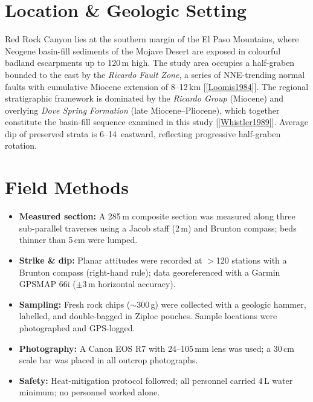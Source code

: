 \documentclass[11pt,a4paper]{article}
\begin{document}
\section{Location \& Geologic Setting}

Red Rock Canyon lies at the southern margin of the El Paso Mountains, where
Neogene basin-fill sediments of the Mojave Desert are exposed in colourful badland
escarpments up to 120\,m high.
The study area occupies a half-graben bounded to the east by the
\textit{Ricardo Fault Zone}, a series of NNE-trending normal faults with
cumulative Miocene extension of 8--12\,km [\ref{Loomis1984}].
The regional stratigraphic framework is dominated by the
\textit{Ricardo Group} (Miocene) and overlying \textit{Dove Spring Formation}
(late Miocene--Pliocene), which together constitute the basin-fill sequence examined in
this study [\ref{Whistler1989}].
Average dip of preserved strata is 6--14\textdegree\ eastward, reflecting progressive
half-graben rotation.

\section{Field Methods}

\begin{itemize}
  \item \textbf{Measured section:} A 285\,m composite section was measured
        along three sub-parallel traverses using a Jacob staff (2\,m) and
        Brunton compass; beds thinner than 5\,cm were lumped.
  \item \textbf{Strike \& dip:} Planar attitudes were recorded at $>$120 stations
        with a Brunton compass (right-hand rule); data georeferenced with a
        Garmin GPSMAP 66i ($\pm$3\,m horizontal accuracy).
  \item \textbf{Sampling:} Fresh rock chips ($\sim$300\,g) were collected with
        a geologic hammer, labelled, and double-bagged in Ziploc pouches.
        Sample locations were photographed and GPS-logged.
  \item \textbf{Photography:} A Canon EOS R7 with 24--105\,mm lens was used;
        a 30\,cm scale bar was placed in all outcrop photographs.
  \item \textbf{Safety:} Heat-mitigation protocol followed; all personnel
        carried 4\,L water minimum; no personnel worked alone.
\end{itemize}
\end{document}
